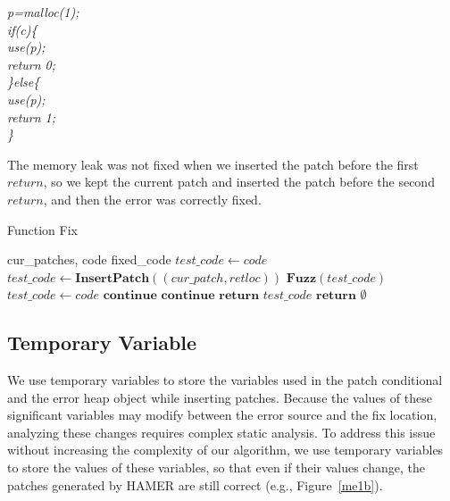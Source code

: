 \documentclass[a4paper,11pt,oneside,openany]{book}
\begin{document}
\begin{minipage}{\textwidth}
    \vspace{0.2cm}
    \textsl{\hspace{0.3cm}p=malloc(1);\\\hspace{0.3cm}if(c)\{\\\hspace{0.6cm}use(p);\\\hspace{0.6cm}return 0;\\\hspace{0.3cm}\}else\{\\\hspace{0.6cm}use(p);\\\hspace{0.6cm}return 1;\\\hspace{0.3cm}\}}
\end{minipage}
The memory leak was not fixed when we inserted the patch before the first $return$, so we kept the current patch and inserted the patch before the second $return$, and then the error was correctly fixed.



 \begin{algorithm}[h]
 \caption{Function Fix}
 \label{funcfix}
 \begin{algorithmic}[1]
 \renewcommand{\algorithmicrequire}{\textbf{Input:}}
 \renewcommand{\algorithmicensure}{\textbf{Output:}}
 \REQUIRE cur\_patches, code
 \ENSURE  fixed\_code
  \STATE $test\_code \gets code$
    \STATE $test\_code \gets \textbf{InsertPatch}((cur\_patch,retloc))$
    \STATE $\textbf{Fuzz}(test\_code)$
     \STATE $test\_code \gets code$
     \STATE $\textbf{continue}$
     \STATE $\textbf{continue}$
    \ELSE 
     \STATE $\textbf{return}$ $test\_code$
    \ENDIF
   \ENDFOR
  \ENDFOR
  \STATE $\textbf{return}$ $\emptyset$
 \end{algorithmic} 
 \end{algorithm}

\subsection{Temporary Variable}
We use temporary variables to store the variables used in the patch conditional and the error heap object while inserting patches. Because the values of these significant variables may modify between the error source and the fix location, analyzing these changes requires complex static analysis. To address this issue without increasing the complexity of our algorithm, we use temporary variables to store the values of these variables, so that even if their values change, the patches generated by HAMER are still correct (e.g., Figure~\ref{me1b}).
\end{document}
